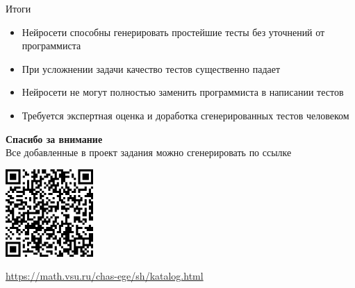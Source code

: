 \documentclass[aspectratio=169,12pt]{beamer}
\begin{document}
\begin{frame}{Итоги}
	\begin{itemize}
		\item Нейросети способны генерировать простейшие тесты без уточнений от программиста
		\item При усложнении задачи качество тестов существенно падает
		\item Нейросети не могут полностью заменить программиста в написании тестов
		\item Требуется экспертная оценка и доработка сгенерированных тестов человеком
	\end{itemize}
\end{frame}

\begin{frame}
	\center\large\textcolor{NordBrightBlue}{\textbf{Спасибо за внимание}}\\
	\hfill \break
	\normalsize
	Все добавленные в проект задания можно сгенерировать по ссылке\\
	\hfill \break

	\includegraphics[width=0.25\textwidth]{images/QR-code}\\
	\hfill \break

	\url{https://math.vsu.ru/chas-ege/sh/katalog.html}
\end{frame}
\end{document}
